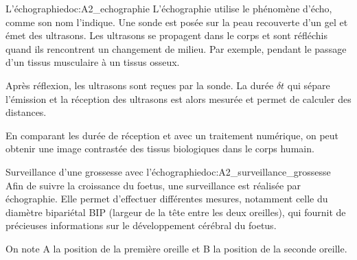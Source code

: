 \begin{doc}{L'échographie}{doc:A2_echographie}
  L'échographie utilise le phénomène d'écho, comme son nom l'indique.
  Une sonde est posée sur la peau recouverte d'un gel et émet des ultrasons.
  Les ultrasons se propagent dans le corps et sont réfléchis quand ils rencontrent un changement de milieu.
  Par exemple, pendant le passage d'un tissus musculaire à un tissus osseux.

  Après réflexion, les ultrasons sont reçues par la sonde.
  La durée $\delta t$ qui sépare l'émission et la réception des ultrasons est alors mesurée et permet de calculer des distances.

  En comparant les durée de réception et avec un traitement numérique, on peut obtenir une image contrastée des tissus biologiques dans le corps humain.

\end{doc}

\begin{doc}{Surveillance d'une grossesse avec l'échographie}{doc:A2_surveillance_grossesse}
  Afin de suivre la croissance du foetus, une surveillance est réalisée par échographie.
  Elle permet d’effectuer différentes mesures, notamment celle du diamètre bipariétal BIP
  (largeur de la tête entre les deux oreilles),
  qui fournit de précieuses informations sur le développement cérébral du foetus.
  
  On note A la position de la première oreille et B la position de la seconde oreille.
\end{doc}





